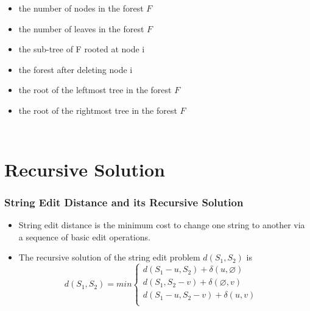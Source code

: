 \documentclass{beamer}
\begin{document}
\begin{frame}
\begin{columns}[c]
\begin{itemize}[]
\item[]  the number of nodes in the forest $F$
\item[]  the number of leaves in the forest $F$
\item[]  the sub-tree of F rooted at node i
\item[]  the forest after deleting node i
\item[]  the root of the leftmost tree in the forest $F$
\item[]  the root of the rightmost tree in the forest $F$
\end{itemize}
\end{columns}
\end{frame}
\section{Recursive Solution}
\begin{frame}
\frametitle{String Edit Distance and its Recursive Solution}
\begin{itemize}
\item String edit distance is the minimum cost to change one string to another via a sequence of basic edit operations.
\item The recursive solution of the string edit problem $d(S_1, S_2)$ is 
\begin{equation*}
d(S_1, S_2) = min \begin{cases}
	  	d(S_1 - u , S_2) + \delta(u, \varnothing) \\ 
      	d(S_1, S_2 - v) + \delta(\varnothing, v) \\ 
    	d(S_1 - u, S_2 - v) + \delta(u, v) & \\ 
    \end{cases}
\end{equation*}
\end{itemize}
\end{frame}
\end{document}
